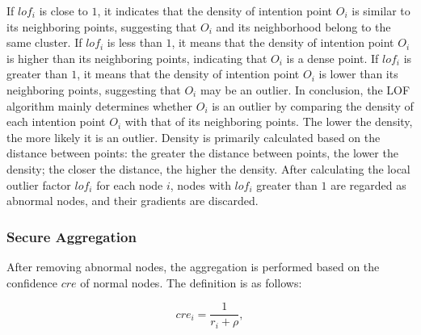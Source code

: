 \documentclass[lettersize,journal]{IEEEtran}
\begin{document}
If $lof_i$ is close to $1$, it indicates that the density of intention point $O_i$ is similar to its neighboring points, suggesting that $O_i$ and its neighborhood belong to the same cluster. If $lof_i$ is less than $1$, it means that the density of intention point $O_i$ is higher than its neighboring points, indicating that $O_i$ is a dense point. If $lof_i$ is greater than $1$, it means that the density of intention point $O_i$ is lower than its neighboring points, suggesting that $O_i$ may be an outlier. In conclusion, the LOF algorithm mainly determines whether $O_i$ is an outlier by comparing the density of each intention point $O_i$ with that of its neighboring points. The lower the density, the more likely it is an outlier. Density is primarily calculated based on the distance between points: the greater the distance between points, the lower the density; the closer the distance, the higher the density. After calculating the local outlier factor $lof_i$ for each node $i$, nodes with $lof_i$ greater than $1$ are regarded as abnormal nodes, and their gradients are discarded.

\subsubsection{Secure Aggregation}
After removing abnormal nodes, the aggregation is performed based on the confidence $cre$ of normal nodes. The definition is as follows:

\begin{equation}
    cre_i=\frac{1}{r_i+\rho},
\end{equation}

\end{document}
